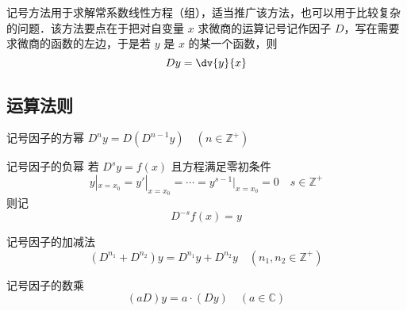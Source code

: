 
\begin{issues}
\issueDraft
\end{issues}

记号方法用于求解常系数线性方程（组），适当推广该方法，也可以用于比较复杂的问题．该方法要点在于把对自变量 $x$ 求微商的运算记号记作因子 $D$，写在需要求微商的函数的左边，于是若 $y$ 是 $x$ 的某一个函数，则
\begin{equation}
Dy=\dv{y}{x}
\end{equation}
\subsection{运算法则}
\begin{definition}{记号因子的方幂}
$D^ny=D(D^{n-1}y)\quad(n\in\mathbb{Z^{+}})$
\end{definition}
\begin{definition}{记号因子的负幂}
若 $D^sy=f(x)$ 且方程满足零初条件
\begin{equation}
y|_{x=x_0}=y'|_{x=x_0}=\cdots=y^{s-1}|_{x=x_0}=0\quad{s\in\mathbb{Z^{+}}}
\end{equation}
则记
\begin{equation}
D^{-s}f(x)=y
\end{equation}

\end{definition}
\begin{definition}{记号因子的加减法}
\begin{equation}
(D^{n_1}+D^{n_2})y=D^{n_1}y+D^{n_2}y\quad(n_1,n_2\in \mathbb{Z^{+
}})
\end{equation}
\end{definition}
\begin{definition}{记号因子的数乘}
\begin{equation}
(aD)y=a\cdot(Dy)\quad(a\in\mathbb{C})
\end{equation}
\end{definition}
